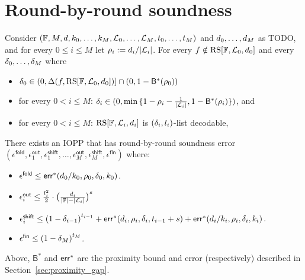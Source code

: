 \section{Round-by-round soundness}\label{sec:rnd_by_rnd_soundness}
\lean{}
\leanok{}
\begin{lemma}\label{lemma:rnd_by_rnd_soundness}
    Consider $(\mathbb{F},M,d,k_0,\ldots,k_M,\mathcal{L}_0,\ldots,\mathcal{L}_M,t_0,\ldots,t_M)$ and $d_0,\ldots,d_M$ as TODO, and for every $0\leq i\leq M$ let $\rho_i:=d_i/|\mathcal{L}_i|$. For every $f\notin\mathrm{RS}[\mathbb{F},\mathcal{L}_0,d_0]$ and every $\delta_0,\ldots,\delta_M$ where
    \begin{itemize}
        \item $\delta_0\in(0,\Delta(f,\mathrm{RS}[\mathbb{F},\mathcal{L}_0,d_0])]\cap(0,1-{\mathsf{B}}^*(\rho_0))$
        \item for every $0<i\leq M$: $\delta_i\in(0,\min{\{1-\rho_i-\frac{1}{|\mathcal{L}_i|},1-{\mathsf{B}^*(\rho_i)}\}})$, and
        \item for every $0<i\leq M$: $\mathrm{RS}[\mathbb{F},\mathcal{L}_i,d_i]$ is $(\delta_i,l_i)$-list decodable,
    \end{itemize}
    There exists an IOPP that has round-by-round soundness error $(\epsilon^{\mathsf{fold}},\epsilon^{\mathsf{out}}_1,\epsilon^{\mathsf{shift}}_1,\ldots,\epsilon^{\mathsf{out}}_M,\epsilon^{\mathsf{shift}}_M,\epsilon^{\mathsf{fin}})$ where:
    \begin{itemize}
        \item $\epsilon^{\mathsf{fold}}\leq\mathsf{err}^*(d_0/k_0,\rho_0,\delta_0,k_0)$.
        \item $\epsilon^{\mathsf{out}}_i\leq\frac{l^2_i}{2}\cdot{\big(\frac{d_i}{|\mathbb{F}|-|\mathcal{L}_i|}\big)}^s$
        \item $\epsilon^{\mathsf{shift}}_i\leq {(1-\delta_{i-1})}^{t_{i-1}}+\mathsf{err}^*(d_i,\rho_i,\delta_i,t_{i-1}+s)+\mathsf{err}^*(d_i/k_i,\rho_i,\delta_i,k_i)$.
        \item $\epsilon^{\mathsf{fin}}\leq{(1-\delta_M)}^{t_M}$.
    \end{itemize}
    Above, ${\mathsf{B}}^*$ and ${\mathsf{err}}^*$ are the proximity bound and error (respectively) described in Section~\ref{sec:proximity_gap}.
\end{lemma}